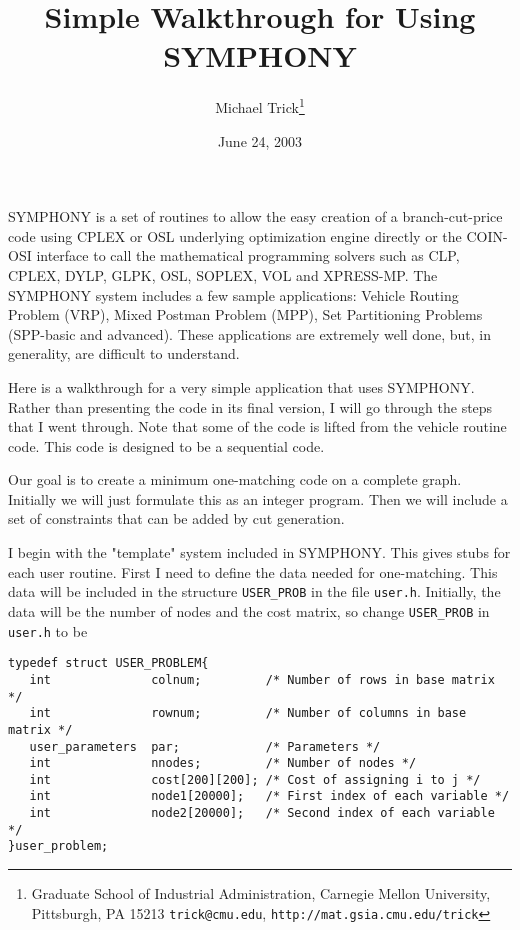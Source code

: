 \documentclass[11pt]{article}
\begin{document}
\title{Simple Walkthrough for Using SYMPHONY}
\author{Michael Trick\thanks{Graduate School of Industrial Administration,
Carnegie Mellon University, Pittsburgh, PA 15213 \texttt{trick@cmu.edu}, 
\texttt{http://mat.gsia.cmu.edu/trick}}}

\date{June 24, 2003}
\maketitle
\thispagestyle{empty}

SYMPHONY is a set of routines to allow the easy creation of a branch-cut-price
code using CPLEX or OSL underlying optimization engine directly or the COIN-OSI 
interface to call the mathematical programming solvers such as CLP, CPLEX, DYLP, 
GLPK, OSL, SOPLEX, VOL and XPRESS-MP. The SYMPHONY system includes a few sample 
applications: Vehicle Routing Problem (VRP), Mixed Postman Problem (MPP), Set 
Partitioning Problems (SPP-basic and advanced). These applications are extremely 
well done, but, in generality, are difficult to understand.

Here is a walkthrough for a very simple application that uses SYMPHONY. Rather
than presenting the code in its final version, I will go through the steps that I
went through. Note that some of the code is lifted from the vehicle routine
code. This code is designed to be a sequential code.

Our goal is to create a minimum one-matching code on a complete graph.
Initially we will just formulate this as an integer program. Then we will
include a set of constraints that can be added by cut generation.

I begin with the "template" system included in SYMPHONY. This gives stubs for
each user routine. First I need to define the data needed for
one-matching. This data will be included in the structure \texttt{USER\_PROB}
in the file \texttt{user.h}.  Initially, the data will be the number of nodes
and the cost matrix, so change \texttt{USER\_PROB} in \texttt{user.h} to be

\begin{verbatim}
typedef struct USER_PROBLEM{
   int              colnum;         /* Number of rows in base matrix */
   int              rownum;         /* Number of columns in base matrix */
   user_parameters  par;            /* Parameters */
   int              nnodes;         /* Number of nodes */
   int              cost[200][200]; /* Cost of assigning i to j */ 
   int              node1[20000];   /* First index of each variable */
   int              node2[20000];   /* Second index of each variable */
}user_problem;
\end{verbatim}
\end{document}
